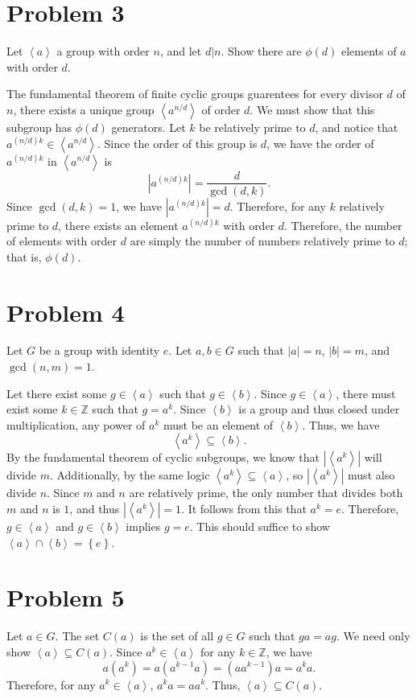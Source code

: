 \documentclass[11pt, letterpaper]{report}
\renewenvironment{solution}[1][]{\begin{setsolution}}{\end{setsolution}}
\begin{document}
\section*{Problem 3}
Let $\left<a \right>$ a group with order $n$, and let $d|n$. Show there are $\phi (d)$ elements of $a$ with order $d$.
\begin{solution}
	The fundamental theorem of finite cyclic groups guarentees for every divisor $d$ of $n$, there exists a unique group $\left<a ^{n/d} \right>$ of order $d$. We must show that this subgroup has $\phi (d)$ generators. Let $k$ be relatively prime to $d$, and notice that $a^{(n /d)k}\in \left<a^{n /d} \right>$. Since the order of this group is $d$, we have the order of $a^{(n /d)k}$ in $\left<a^{n /d} \right>$ is
	\[
		\left| a^{(n /d)k} \right| =\frac{d}{\operatorname{gcd}(d,k) }
	.\]
	Since $\operatorname{gcd}(d,k) =1$, we have $\left|a^{(n /d)k}\right| =d$. Therefore, for any $k$ relatively prime to $d$, there exists an element $a^{(n /d)k}$ with order $d$. Therefore, the number of elements with order $d$ are simply the number of numbers relatively prime to $d$; that is, $\phi (d)$.
\end{solution}
\section*{Problem 4}
\begin{solution}
	Let $G$ be a group with identity $e$. Let $a,b\in G$ such that $\left| a \right| =n$, $\left| b \right| =m$, and $\operatorname{gcd}(n,m) =1$.

	Let there exist some $g\in \left<a \right>$ such that $g\in \left<b \right>$. Since $g\in \left<a \right>$, there must exist some $k\in\mathbb{Z}$ such that $g=a^k$. Since $\left<b \right>$ is a group and thus closed under multiplication, any power of $a^k$ must be an element of $\left<b \right>$. Thus, we have
	\[
		\left<a^k \right>\subseteq \left<b \right>
	.\]
	By the fundamental theorem of cyclic subgroups, we know that $\left| \left<a^k \right> \right| $ will divide $m$. Additionally, by the same logic $\left<a^k \right>\subseteq \left<a \right>$, so $\left| \left<a^k \right> \right| $ must also divide $n$. Since $m$ and $n$ are relatively prime, the only number that divides both $m$ and $n$ is $1$, and thus $\left| \left<a^k \right> \right| =1$. It follows from this that $a^k=e$. Therefore, $g\in \left<a \right>$ and $g\in \left<b \right>$ implies $g=e$. This should suffice to show $\left<a \right>\cap \left<b \right> = \left\{ e \right\} $.
\end{solution}
\section*{Problem 5}
\begin{solution}
	Let $a\in G$. The set $C(a)$ is the set of all $g\in G$ such that $ga=ag$. We need only show $\left<a \right>\subseteq C(a)$. Since $a^k\in \left<a \right>$ for any $k\in\mathbb{Z}$, we have
	\[
		a\left( a^k \right) =a\left( a^{k-1}a \right) =\left( aa^{k-1} \right) a=a^{k}a
	.\]
	Therefore, for any $a^k\in \left<a \right>$, $a^ka=aa^k$. Thus, $\left<a \right>\subseteq C(a)$.
\end{solution}
\end{document}
